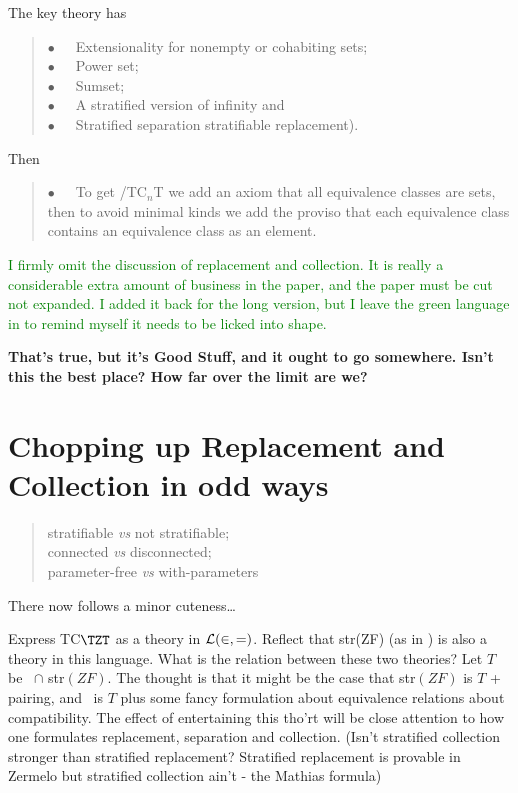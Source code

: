 \documentclass[12pt]{article}
\begin{document}
{The key theory has
\begin{quote}
$\bullet$ \mbox{\, \,} Extensionality for nonempty or cohabiting sets;\\ 
$\bullet$ \mbox{\, \,} Power set;\\
$\bullet$ \mbox{\, \,} Sumset;\\
$\bullet$ \mbox{\, \,} A stratified version of infinity and\\
$\bullet$ \mbox{\, \,} Stratified separation %
stratifiable replacement).
\end{quote}
  Then
\begin{quote}

$\bullet$ \mbox{\, \,} To get \TZT/TC$_n$T we add an axiom that all equivalence classes are sets, then to avoid minimal kinds we add the proviso that each equivalence class contains an equivalence class as an element.
\end{quote}

\textcolor{green}{I firmly omit the discussion of replacement and collection.  It is really a considerable extra amount of business in the paper, and the paper must be cut not expanded.  I added it back for the long version, but I leave the green language in to remind myself it needs to be licked into shape.}

{\bf That's true, but it's Good Stuff, and it ought to go somewhere.  Isn't this the best place?  How far over the limit are we?}

\section{Chopping up Replacement and Collection in odd ways}
\begin{quote}
stratifiable {\sl vs} not stratifiable;\\
connected {\sl vs} disconnected;\\
parameter-free {\sl vs} with-parameters\end{quote}

There now follows a minor cuteness\ldots 

Express TC$\TZT$ as a theory in ${\cal L}(\in,=)$.  Reflect that
str(ZF) (as in \cite{baltimore}) is also a theory in this language.
What is the relation between these two theories?  Let $T$ be \TZT\,
$\cap$ str$(ZF)$.  The
thought is that it might be the case that str$(ZF)$ is $T$ + pairing,
and \TZT\ is $T$ plus some fancy formulation about equivalence
relations about compatibility.  The effect of entertaining this tho'rt
will be close attention to how one formulates replacement, separation
and collection.  (Isn't stratified collection stronger than stratified
replacement?  Stratified replacement is provable in Zermelo but
stratified collection ain't - the Mathias formula)


}
\end{document}
